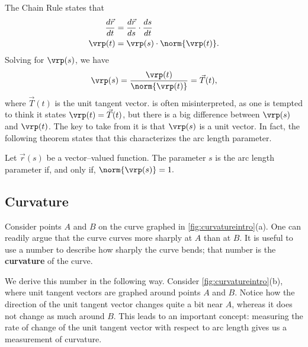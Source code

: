 The Chain Rule states that 
\begin{align*}
\frac{d\vec r}{dt} &= \frac{d\vec r}{ds}\cdot\frac{ds}{dt}\\
\vrp(t) &= \vrp(s)\cdot \norm{\vrp(t)}.
\end{align*}
Solving for $\vrp(s)$, we have 
\begin{equation}
\vrp(s) = \frac{\vrp(t)}{\norm{\vrp(t)}} = \vec T(t),\label{eq:vvfarc2}
\end{equation}
where $\vec T(t)$ is the unit tangent vector.  is often misinterpreted, as one is tempted to think it states $\vrp(t) = \vec T(t)$, but there is a big difference between $\vrp(s)$ and $\vrp(t)$. The key to take from it is that $\vrp(s)$ is a unit vector. In fact, the following theorem states that this characterizes the arc length parameter.

{Let $\vec r(s)$ be a vector--valued function. The parameter $s$ is the arc length parameter if, and only if, $\norm{\vrp(s)} = 1.$}

\subsection*{Curvature}

Consider points $A$ and $B$ on the curve graphed in \autoref{fig:curvatureintro}(a). One can readily argue that the curve curves more sharply at $A$ than at $B$. It is useful to use a number to describe how sharply the curve bends; that number is the \textbf{curvature} of the curve.

We derive this number in the following way. Consider \autoref{fig:curvatureintro}(b), where  unit tangent vectors are graphed around points $A$ and $B$. Notice how the direction of the unit tangent vector changes quite a bit near $A$, whereas it does not change as much around $B$. This leads to an important concept: measuring the rate of change of the unit tangent vector with respect to arc length gives us a measurement of curvature.

